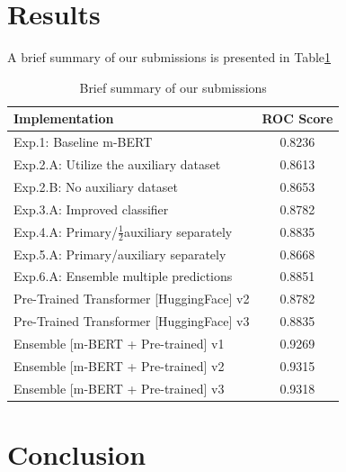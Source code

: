 \documentclass[10pt,twocolumn,letterpaper]{article}
\begin{document}
 
\section{Results}
A brief summary of our submissions is presented in Table\ref{ResultsSummary}
\begin{table}
\begin{center}
\begin{tabular}{|l|c|}
\hline
Implementation	& ROC Score \\
\hline\hline

Exp.1: Baseline m-BERT	& 0.8236    \\
Exp.2.A: Utilize the auxiliary dataset & 0.8613 \\
Exp.2.B: No auxiliary dataset	&0.8653 \\
Exp.3.A: Improved classifier & 0.8782 \\
Exp.4.A: Primary/$\frac{1}{2}$auxiliary separately & 0.8835 \\
Exp.5.A: Primary/auxiliary separately & 0.8668  \\
Exp.6.A: Ensemble multiple predictions & 0.8851 \\
Pre-Trained Transformer [HuggingFace] v2	&0.8782 \\
Pre-Trained Transformer [HuggingFace] v3	&0.8835  \\
Ensemble [m-BERT + Pre-trained] v1 	& 0.9269   \\
Ensemble [m-BERT + Pre-trained] v2 	& 0.9315   \\
Ensemble [m-BERT + Pre-trained] v3 	& 0.9318  \\

\hline
\end{tabular}
\end{center}
\caption{\label{ResultsSummary} Brief summary of our submissions}
\end{table}
\section{Conclusion}



{\small


}
\end{document}
